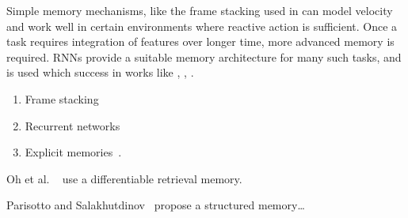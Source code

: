 Simple memory mechanisms, like the frame stacking used in \cite{mnih_human_2015} can model velocity and work well in certain environments where reactive action is sufficient.
Once a task requires integration of features over longer time, more advanced memory is required.
RNNs provide a suitable memory architecture for many such tasks, and is used which success in works like \cite{mnih_attention_2014}, \cite{mnih_asynchronous_2016}, \cite{...}.


\begin{enumerate}
    \item Frame stacking
    \item Recurrent networks
    \item Explicit memories~\cite{oh_minecraft_2016,parisotto_salakhutdinov_2017}.
\end{enumerate}


Oh et al. ~\cite{oh_minecraft_2016} use a differentiable retrieval memory.

Parisotto and Salakhutdinov~\cite{parisotto_salakhutdinov_2017} propose a structured memory\dots %



